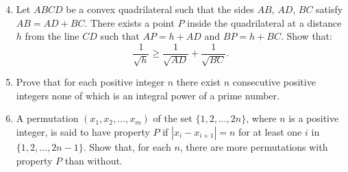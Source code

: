 \documentclass[12pt]{article}
\begin{document}
\vspace*{.3in}

\begin{enumerate}
\setcounter{enumi}{3}
\item
Let $ABCD$ be a convex quadrilateral such that the sides $AB$, $AD$, $BC$
satisfy $AB = AD + BC$.  There exists a point $P$ inside the quadrilateral at a
distance $h$ from the line $CD$ such that $AP = h + AD$ and $BP = h + BC$.
Show that:
$$\frac{1}{\sqrt{h}} \geq \frac{1}{\sqrt{AD}} + \frac{1}{\sqrt{BC}}.$$

\item
Prove that for each positive integer $n$ there exist $n$ consecutive positive
integers none of which is an integral power of a prime number.

\item
A permutation $(x_1, x_2, \ldots, x_m)$ of the set $\{1, 2, \ldots, 2n\}$,
where $n$ is a positive integer, is said to have property $P$ if $|x_i -
x_{i+1}| = n$ for at least one $i$ in $\{1, 2, \ldots, 2n - 1\}$.  Show that,
for each $n$, there are more permutations with property $P$ than without.
\end{enumerate}
\end{document}
